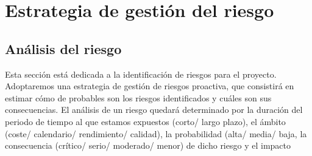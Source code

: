 \documentclass[11pt, a4paper, twoside]{report}
\begin{document}
	\section{Estrategia de gestión del riesgo}
		\subsection{Análisis del riesgo}
		Esta sección está dedicada a la identificación de riesgos para el proyecto. Adoptaremos una estrategia de gestión de riesgos proactiva, que consistirá en estimar cómo de probables son los riesgos identificados y cuáles son sus consecuencias. El análisis de un riesgo quedará determinado por la duración del periodo de tiempo al que estamos expuestos (corto/ largo plazo), el ámbito (coste/ calendario/ rendimiento/ calidad), la probabilidad (alta/ media/ baja, la consecuencia (crítico/ serio/ moderado/ menor) de dicho riesgo y el impacto
\end{document}

